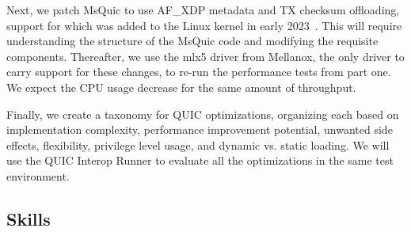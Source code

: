 \documentclass[NET,a4paper,12pt,english]{netforms}
\begin{document}
Next, we patch MsQuic to use AF\_XDP metadata and TX checksum offloading, support for which was added to the Linux kernel in early 2023~\cite{fomichev2023xsk}. This will require understanding the structure of the MsQuic code and modifying the requisite components. Thereafter, we use the mlx5 driver from Mellanox, the only driver to carry support for these changes, to re-run the performance tests from part one. We expect the CPU usage decrease for the same amount of throughput.

Finally, we create a taxonomy for QUIC optimizations, organizing each based on implementation complexity, performance improvement potential, unwanted side effects, flexibility, privilege level usage, and dynamic vs. static loading. We will use the QUIC Interop Runner to evaluate all the optimizations in the same test environment.



\subsection*{Skills}
\end{document}
